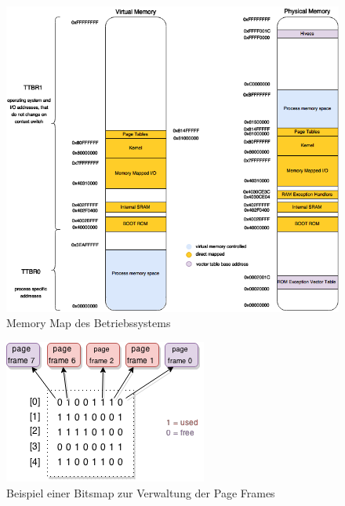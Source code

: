 \begin{figure}
	\includegraphics[scale=0.7]{figures/MemoryMap}
	\caption{Memory Map des Betriebssystems}
	\label{fig:MemoryMap}
\end{figure}


\begin{figure}
	\centering
	\includegraphics[scale=1]{figures/BitsMap}
	\caption{Beispiel einer Bitsmap zur Verwaltung der Page Frames}
	\label{fig:BitsMap}
\end{figure}

\pagebreak 
